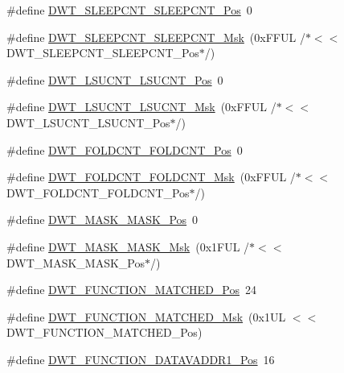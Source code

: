 \begin{DoxyCompactItemize}
\item 
\#define \hyperlink{group___c_m_s_i_s___d_w_t_ga0371a84a7996dc5852c56afb2676ba1c}{D\+W\+T\+\_\+\+S\+L\+E\+E\+P\+C\+N\+T\+\_\+\+S\+L\+E\+E\+P\+C\+N\+T\+\_\+\+Pos}~0
\item 
\#define \hyperlink{group___c_m_s_i_s___d_w_t_ga1e340751d71413fef400a0a1d76cc828}{D\+W\+T\+\_\+\+S\+L\+E\+E\+P\+C\+N\+T\+\_\+\+S\+L\+E\+E\+P\+C\+N\+T\+\_\+\+Msk}~(0x\+F\+F\+U\+L /$\ast$$<$$<$ D\+W\+T\+\_\+\+S\+L\+E\+E\+P\+C\+N\+T\+\_\+\+S\+L\+E\+E\+P\+C\+N\+T\+\_\+\+Pos$\ast$/)
\item 
\#define \hyperlink{group___c_m_s_i_s___d_w_t_gab9394c7911b0b4312a096dad91d53a3d}{D\+W\+T\+\_\+\+L\+S\+U\+C\+N\+T\+\_\+\+L\+S\+U\+C\+N\+T\+\_\+\+Pos}~0
\item 
\#define \hyperlink{group___c_m_s_i_s___d_w_t_ga2186d7fc9317e20bad61336ee2925615}{D\+W\+T\+\_\+\+L\+S\+U\+C\+N\+T\+\_\+\+L\+S\+U\+C\+N\+T\+\_\+\+Msk}~(0x\+F\+F\+U\+L /$\ast$$<$$<$ D\+W\+T\+\_\+\+L\+S\+U\+C\+N\+T\+\_\+\+L\+S\+U\+C\+N\+T\+\_\+\+Pos$\ast$/)
\item 
\#define \hyperlink{group___c_m_s_i_s___d_w_t_ga7f8af5ac12d178ba31a516f6ed141455}{D\+W\+T\+\_\+\+F\+O\+L\+D\+C\+N\+T\+\_\+\+F\+O\+L\+D\+C\+N\+T\+\_\+\+Pos}~0
\item 
\#define \hyperlink{group___c_m_s_i_s___d_w_t_ga9cb73d0342d38b14e41027d3c5c02647}{D\+W\+T\+\_\+\+F\+O\+L\+D\+C\+N\+T\+\_\+\+F\+O\+L\+D\+C\+N\+T\+\_\+\+Msk}~(0x\+F\+F\+U\+L /$\ast$$<$$<$ D\+W\+T\+\_\+\+F\+O\+L\+D\+C\+N\+T\+\_\+\+F\+O\+L\+D\+C\+N\+T\+\_\+\+Pos$\ast$/)
\item 
\#define \hyperlink{group___c_m_s_i_s___d_w_t_gaf798ae34e2b9280ea64f4d9920cd2e7d}{D\+W\+T\+\_\+\+M\+A\+S\+K\+\_\+\+M\+A\+S\+K\+\_\+\+Pos}~0
\item 
\#define \hyperlink{group___c_m_s_i_s___d_w_t_gadd798deb0f1312feab4fb05dcddc229b}{D\+W\+T\+\_\+\+M\+A\+S\+K\+\_\+\+M\+A\+S\+K\+\_\+\+Msk}~(0x1\+F\+U\+L /$\ast$$<$$<$ D\+W\+T\+\_\+\+M\+A\+S\+K\+\_\+\+M\+A\+S\+K\+\_\+\+Pos$\ast$/)
\item 
\#define \hyperlink{group___c_m_s_i_s___d_w_t_ga22c5787493f74a6bacf6ffb103a190ba}{D\+W\+T\+\_\+\+F\+U\+N\+C\+T\+I\+O\+N\+\_\+\+M\+A\+T\+C\+H\+E\+D\+\_\+\+Pos}~24
\item 
\#define \hyperlink{group___c_m_s_i_s___d_w_t_gac8b1a655947490280709037808eec8ac}{D\+W\+T\+\_\+\+F\+U\+N\+C\+T\+I\+O\+N\+\_\+\+M\+A\+T\+C\+H\+E\+D\+\_\+\+Msk}~(0x1\+U\+L $<$$<$ D\+W\+T\+\_\+\+F\+U\+N\+C\+T\+I\+O\+N\+\_\+\+M\+A\+T\+C\+H\+E\+D\+\_\+\+Pos)
\item 
\#define \hyperlink{group___c_m_s_i_s___d_w_t_ga8b75e8ab3ffd5ea2fa762d028dc30e8c}{D\+W\+T\+\_\+\+F\+U\+N\+C\+T\+I\+O\+N\+\_\+\+D\+A\+T\+A\+V\+A\+D\+D\+R1\+\_\+\+Pos}~16
$$
\end{DoxyCompactItemize}
